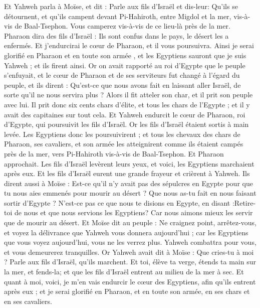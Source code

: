 \begin{multicols}{2}
\VerseOne{}Et Yahweh parla à Moïse, et dit :
Parle aux fils d'Israël et dis-leur: Qu'ils se détournent, et qu'ils campent devant Pi-Hahiroth, entre Migdol et la mer, vis-à-vis de Baal-Tsephon. Vous camperez vis-à-vis de ce lieu-là près de la mer.
Pharaon dira des fils d'Israël : Ils sont confus dans le pays, le désert les a enfermés.
Et j'endurcirai le cœur de Pharaon, et il vous poursuivra. Ainsi je serai glorifié en Pharaon et en toute son armée , et les Egyptiens sauront que je suis Yahweh ; et ils firent ainsi.
Or on avait rapporté au roi d'Egypte que le peuple s'enfuyait, et le cœur de Pharaon et de ses serviteurs fut changé à l'égard du peuple, et ils dirent : Qu'est-ce que nous avons fait en laissant aller Israël, de sorte qu'il ne nous servira plus ?
Alors il fit atteler son char, et il prit son peuple avec lui.
Il prit donc six cents chars d'élite, et tous les chars de l'Egypte ; et il y avait des capitaines sur tout cela.
Et Yahweh endurcit le cœur de Pharaon, roi d'Egypte, qui poursuivit les fils d'Israël. Or les fils d'Israël étaient sortis à main levée.
Les Egyptiens donc les poursuivirent ; et tous les chevaux des chars de Pharaon, ses cavaliers, et son armée les atteignirent comme ils étaient campés près de la mer, vers Pi-Hahiroth vis-à-vis de Baal-Tsephon.
Et Pharaon approchait. Les fils d'Israël levèrent leurs yeux, et voici, les Egyptiens marchaient après eux. Et les fils d'Israël eurent une grande frayeur et crièrent à Yahweh.
Ils dirent aussi à Moïse : Est-ce qu'il n'y avait pas des sépulcres en Egypte pour que tu nous aies emmenés pour mourir au désert ? Que nous as-tu fait en nous faisant sortir d'Egypte ?
N’est-ce pas ce que nous te disions en Egypte, en disant :Retire-toi de nous et que nous servions les Egyptiens? Car nous aimons mieux les servir que de mourir au désert.
Et Moïse dit au peuple : Ne craignez point, arrêtez-vous, et voyez la délivrance que Yahweh vous donnera aujourd'hui ; car les Egyptiens que vous voyez aujourd'hui, vous ne les verrez plus.
Yahweh combattra pour vous, et vous demeurerez tranquilles.
Or Yahweh avait dit à Moïse : Que cries-tu à moi ? Parle aux fils d'Israël, qu'ils marchent.
Et toi, élève ta verge,  étends ta main sur la mer, et fends-la; et  que les fils d'Israël entrent au milieu de la mer à sec.
 Et quant à moi, voici, je m'en vais endurcir le cœur des Egyptiens, afin qu'ils entrent après eux ; et je serai glorifié en Pharaon, et en toute son armée, en ses chars et en ses cavaliers.

\end{multicols}
